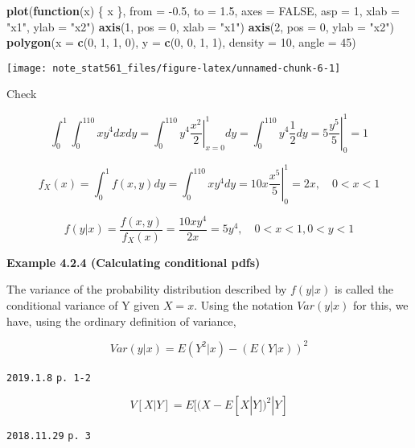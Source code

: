 \documentclass[]{tufte-book}
\newenvironment{Shaded}{}{}
\newcommand{\ControlFlowTok}[1]{\textcolor[rgb]{0.00,0.44,0.13}{\textbf{#1}}}
\newcommand{\DataTypeTok}[1]{\textcolor[rgb]{0.56,0.13,0.00}{#1}}
\newcommand{\DecValTok}[1]{\textcolor[rgb]{0.25,0.63,0.44}{#1}}
\newcommand{\FloatTok}[1]{\textcolor[rgb]{0.25,0.63,0.44}{#1}}
\newcommand{\KeywordTok}[1]{\textcolor[rgb]{0.00,0.44,0.13}{\textbf{#1}}}
\newcommand{\NormalTok}[1]{#1}
\newcommand{\OtherTok}[1]{\textcolor[rgb]{0.00,0.44,0.13}{#1}}
\newcommand{\StringTok}[1]{\textcolor[rgb]{0.25,0.44,0.63}{#1}}
\begin{document}
\begin{Shaded}
\begin{Highlighting}[]
\KeywordTok{plot}\NormalTok{(}\ControlFlowTok{function}\NormalTok{(x) \{}
\NormalTok{    x}
\NormalTok{\}, }\DataTypeTok{from =} \FloatTok{-0.5}\NormalTok{, }\DataTypeTok{to =} \FloatTok{1.5}\NormalTok{, }\DataTypeTok{axes =} \OtherTok{FALSE}\NormalTok{, }\DataTypeTok{asp =} \DecValTok{1}\NormalTok{, }\DataTypeTok{xlab =} \StringTok{"x1"}\NormalTok{, }
    \DataTypeTok{ylab =} \StringTok{"x2"}\NormalTok{)}
\KeywordTok{axis}\NormalTok{(}\DecValTok{1}\NormalTok{, }\DataTypeTok{pos =} \DecValTok{0}\NormalTok{, }\DataTypeTok{xlab =} \StringTok{"x1"}\NormalTok{)}
\KeywordTok{axis}\NormalTok{(}\DecValTok{2}\NormalTok{, }\DataTypeTok{pos =} \DecValTok{0}\NormalTok{, }\DataTypeTok{ylab =} \StringTok{"x2"}\NormalTok{)}
\KeywordTok{polygon}\NormalTok{(}\DataTypeTok{x =} \KeywordTok{c}\NormalTok{(}\DecValTok{0}\NormalTok{, }\DecValTok{1}\NormalTok{, }\DecValTok{1}\NormalTok{, }\DecValTok{0}\NormalTok{), }\DataTypeTok{y =} \KeywordTok{c}\NormalTok{(}\DecValTok{0}\NormalTok{, }\DecValTok{0}\NormalTok{, }\DecValTok{1}\NormalTok{, }\DecValTok{1}\NormalTok{), }\DataTypeTok{density =} \DecValTok{10}\NormalTok{, }\DataTypeTok{angle =} \DecValTok{45}\NormalTok{)}
\end{Highlighting}
\end{Shaded}

\texttt{[image: note\_stat561\_files/figure-latex/unnamed-chunk-6-1]}

Check

\[\int_0^1\int_0^110xy^4dxdy=\int_0^110y^4\left.\frac{x^2}2\right|_{x=0}^1dy=\int_0^110y^4\frac{1}2dy=5\left.\frac{y^5}5\right|_0^1=1\]

\[f_X(x)=\int_0^1f(x,y)dy=\int_0^110xy^4dy=10x\left.\frac{x^5}5\right|_0^1=2x,\quad0<x<1\]

\[f(y|x)=\frac{f(x,y)}{f_X(x)}=\frac{10xy^4}{2x}=5y^4,\quad 0<x<1,0<y<1\]

\textbf{Example 4.2.4 (Calculating conditional pdfs)}

The variance of the probability distribution described by \(f(y|x)\) is
called the conditional variance of Y given \(X=x\). Using the notation
\(Var(y|x)\) for this, we have, using the ordinary definition of
variance,

\[Var(y|x)=E(Y^2|x)-(E(Y|x))^2\]

\texttt{2019.1.8} \texttt{p.\ 1-2}

\[V[X|Y]=E[(X-E[X|Y])^2|Y]\]

\texttt{2018.11.29} \texttt{p.\ 3}
\end{document}
